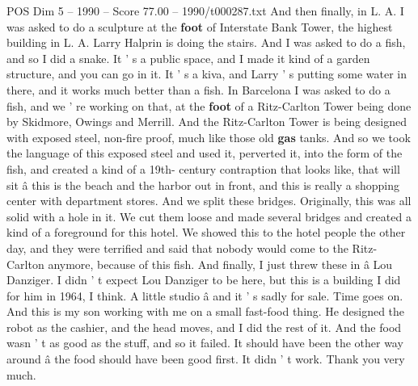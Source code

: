 \begin{textsample}{POS Dim 5 – 1990 – Score 77.00 – 1990/t000287.txt}
And then finally, in L.
A.
I was asked to do a sculpture at the \textbf{foot} of Interstate Bank Tower, the highest building in L.
A.
Larry Halprin is doing the stairs.
And I was asked to do a fish, and so I did a snake.
It ' s a public space, and I made it kind of a garden structure, and you can go in it.
It ' s a kiva, and Larry ' s putting some water in there, and it works much better than a fish.
In Barcelona I was asked to do a fish, and we ' re working on that, at the \textbf{foot} of a Ritz-Carlton Tower being done by Skidmore, Owings and Merrill.
And the Ritz-Carlton Tower is being designed with exposed steel, non-fire proof, much like those old \textbf{gas} tanks.
And so we took the language of this exposed steel and used it, perverted it, into the form of the fish, and created a kind of a 19th- century contraption that looks like, that will sit â this is the beach and the harbor out in front, and this is really a shopping center with department stores.
And we split these bridges.
Originally, this was all solid with a hole in it.
We cut them loose and made several bridges and created a kind of a foreground for this hotel.
We showed this to the hotel people the other day, and they were terrified and said that nobody would come to the Ritz-Carlton anymore, because of this fish.
And finally, I just threw these in â Lou Danziger.
I didn ' t expect Lou Danziger to be here, but this is a building I did for him in 1964, I think.
A little studio â and it ' s sadly for sale.
Time goes on.
And this is my son working with me on a small fast-food thing.
He designed the robot as the cashier, and the head moves, and I did the rest of it.
And the food wasn ' t as good as the stuff, and so it failed.
It should have been the other way around â the food should have been good first.
It didn ' t work.
Thank you very much.

\end{textsample}

